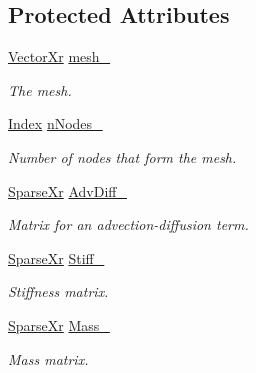 \subsection*{Protected Attributes}
\begin{DoxyCompactItemize}
\item 
\hypertarget{classPdeSolver1D_a99efe6ddef2043e5aa5d0c14aa1e468b}{\hyperlink{typedefs_8h_aae6cee78ed9cd8f234ed8cb48682548a}{Vector\-Xr} \hyperlink{classPdeSolver1D_a99efe6ddef2043e5aa5d0c14aa1e468b}{mesh\-\_\-}}\label{classPdeSolver1D_a99efe6ddef2043e5aa5d0c14aa1e468b}

\begin{DoxyCompactList}\small\item\em The mesh. \end{DoxyCompactList}\item 
\hypertarget{classPdeSolver1D_a574676917a0d7d70140f4ed29bb1e8b4}{\hyperlink{typedefs_8h_a2c726f8f32697958e9d6c2afecda531d}{Index} \hyperlink{classPdeSolver1D_a574676917a0d7d70140f4ed29bb1e8b4}{n\-Nodes\-\_\-}}\label{classPdeSolver1D_a574676917a0d7d70140f4ed29bb1e8b4}

\begin{DoxyCompactList}\small\item\em Number of nodes that form the mesh. \end{DoxyCompactList}\item 
\hypertarget{classPdeSolver1D_aab986b3e8e274bb85144dad225dcb31d}{\hyperlink{typedefs_8h_a6d3b7db3fa8171d0e743df848524c269}{Sparse\-Xr} \hyperlink{classPdeSolver1D_aab986b3e8e274bb85144dad225dcb31d}{Adv\-Diff\-\_\-}}\label{classPdeSolver1D_aab986b3e8e274bb85144dad225dcb31d}

\begin{DoxyCompactList}\small\item\em Matrix for an advection-\/diffusion term. \end{DoxyCompactList}\item 
\hypertarget{classPdeSolver1D_a7c5250f1553811e6a98dd771c2699c4d}{\hyperlink{typedefs_8h_a6d3b7db3fa8171d0e743df848524c269}{Sparse\-Xr} \hyperlink{classPdeSolver1D_a7c5250f1553811e6a98dd771c2699c4d}{Stiff\-\_\-}}\label{classPdeSolver1D_a7c5250f1553811e6a98dd771c2699c4d}

\begin{DoxyCompactList}\small\item\em Stiffness matrix. \end{DoxyCompactList}\item 
\hypertarget{classPdeSolver1D_a3c0eafffe0b07ee6e232899c2270f450}{\hyperlink{typedefs_8h_a6d3b7db3fa8171d0e743df848524c269}{Sparse\-Xr} \hyperlink{classPdeSolver1D_a3c0eafffe0b07ee6e232899c2270f450}{Mass\-\_\-}}\label{classPdeSolver1D_a3c0eafffe0b07ee6e232899c2270f450}

\begin{DoxyCompactList}\small\item\em Mass matrix. \end{DoxyCompactList}\end{DoxyCompactItemize}
